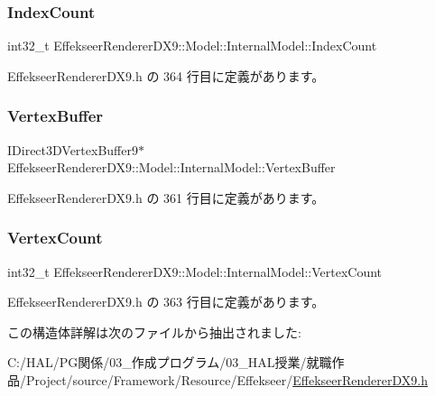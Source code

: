 \subsubsection{\texorpdfstring{Index\+Count}{IndexCount}}
{\footnotesize\ttfamily int32\+\_\+t Effekseer\+Renderer\+D\+X9\+::\+Model\+::\+Internal\+Model\+::\+Index\+Count}



 Effekseer\+Renderer\+D\+X9.\+h の 364 行目に定義があります。

\mbox{\label{struct_effekseer_renderer_d_x9_1_1_model_1_1_internal_model_ae47af8573eafc74b9342778439bcfc62}} 
\subsubsection{\texorpdfstring{Vertex\+Buffer}{VertexBuffer}}
{\footnotesize\ttfamily I\+Direct3\+D\+Vertex\+Buffer9$\ast$ Effekseer\+Renderer\+D\+X9\+::\+Model\+::\+Internal\+Model\+::\+Vertex\+Buffer}



 Effekseer\+Renderer\+D\+X9.\+h の 361 行目に定義があります。

\mbox{\label{struct_effekseer_renderer_d_x9_1_1_model_1_1_internal_model_a1eec4f06fe34a77750440a003b9aa7af}} 
\subsubsection{\texorpdfstring{Vertex\+Count}{VertexCount}}
{\footnotesize\ttfamily int32\+\_\+t Effekseer\+Renderer\+D\+X9\+::\+Model\+::\+Internal\+Model\+::\+Vertex\+Count}



 Effekseer\+Renderer\+D\+X9.\+h の 363 行目に定義があります。



この構造体詳解は次のファイルから抽出されました\+:\begin{DoxyCompactItemize}
\item 
C\+:/\+H\+A\+L/\+P\+G関係/03\+\_\+作成プログラム/03\+\_\+\+H\+A\+L授業/就職作品/\+Project/source/\+Framework/\+Resource/\+Effekseer/\mbox{\hyperlink{_effekseer_renderer_d_x9_8h}{Effekseer\+Renderer\+D\+X9.\+h}}\end{DoxyCompactItemize}
